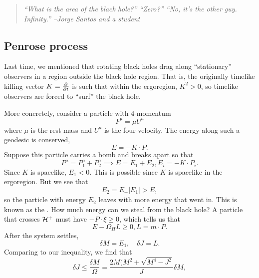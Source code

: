 \begin{quote}
    \textit{``What is the area of the black hole?'' ``Zero?'' ``No, it's the other guy. Infinity.'' --Jorge Santos and a student}
\end{quote}

\subsection*{Penrose process} 
Last time, we mentioned that rotating black holes drag along ``stationary'' observers in a region outside the black hole region. That is, the originally timelike killing vector $K=\P{}{t}$ is such that within the ergoregion, $K^2>0$, so timelike observers are forced to ``surf'' the black hole.

More concretely, consider a particle with 4-momentum
\begin{equation}
    P^a =  \mu U^a
\end{equation}
where $\mu$ is the rest mass and $U^a$ is the four-velocity.
The energy along such a geodesic is conserved,
\begin{equation}
    E=-K \cdot P.
\end{equation}
Suppose this particle carries a bomb and breaks apart so that
\begin{equation}
    P^a = P_1^a + P_2^a\implies E=E_1+E_2, E_i=-K\cdot P_i.
\end{equation}
Since $K$ is spacelike, $E_1<0$. This is possible since $K$ is spacelike in the ergoregion. But we see that
\begin{equation}
    E_2 = E_+|E_1| >E,
\end{equation}
so the particle with energy $E_2$ leaves with more energy that went in.
This is known as the . How much energy can we steal from the black hole? A particle that crosses $\cH^+$ must have $-P\cdot \xi \geq 0$, which tells us that
\begin{equation}
    E-\Omega_H L \geq 0 , L= m \cdot P.
\end{equation}
After the system settles,
\begin{equation}
    \delta M = E_1, \quad \delta J=L.
\end{equation}
Comparing to our inequality, we find that
\begin{equation}
    \delta J \leq \frac{\delta M}{\Omega} =\frac{2M(M^2+\sqrt{M^4 - J^2}}{J} \delta M,
\end{equation}
